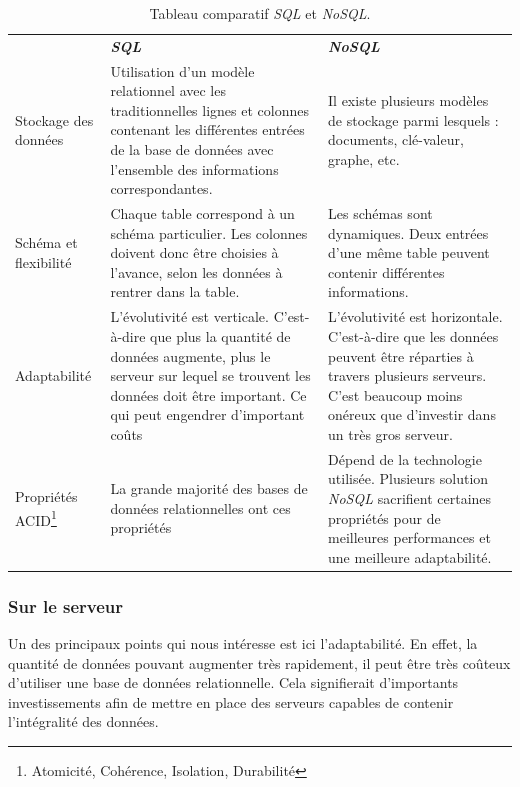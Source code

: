 \documentclass[a4paper,10pt, twoside]{report}
\begin{document}
\begin{spacing}{1.2}
\begin{savenotes}
\begin{table}[h!]
  \def\arraystretch{1.5}
  \setlength{\fboxsep}{13pt} %
  \setlength{\fboxrule}{0pt} %
  \begin{tabular}{lm{6cm}m{6cm}}
   \rowcolor{arkred} 
    \arrayrulecolor{gray73}\hline
    & \color{white} \textbf{\textit{SQL}} &
    \color{white} \textbf{\textit{NoSQL}}\\
    Stockage des données & Utilisation d'un modèle relationnel avec les
    traditionnelles lignes et colonnes contenant les différentes entrées de
    la base de données avec l'ensemble des informations correspondantes. &
    Il existe plusieurs modèles de stockage parmi lesquels : documents,
    clé-valeur, graphe, etc.\\
    \hline
    Schéma et flexibilité & Chaque table correspond à un schéma
    particulier. Les colonnes doivent donc être choisies à l'avance, selon
    les données à rentrer dans la table. & Les schémas sont dynamiques.
    Deux entrées d'une même table peuvent contenir différentes
    informations.\\
    \hline
    Adaptabilité & L'évolutivité est verticale. C'est-à-dire que plus
    la quantité de données augmente, plus le serveur sur lequel se trouvent
    les données doit être important. Ce qui peut engendrer d'important
    coûts & L'évolutivité est horizontale. C'est-à-dire que les
    données peuvent être réparties à travers plusieurs serveurs. C'est beaucoup
    moins onéreux que d'investir dans un très gros serveur.\\
    \hline
    Propriétés ACID\footnote{Atomicité, Cohérence, Isolation,
    Durabilité} & La grande majorité des bases de données relationnelles
    ont ces propriétés & Dépend de la technologie utilisée. Plusieurs
    solution \textit{NoSQL} sacrifient certaines propriétés pour de meilleures
    performances et une meilleure adaptabilité.\\
  \end{tabular}
  \caption{\label{tabSQLNoSQL} Tableau comparatif \textit{SQL} et
  \textit{NoSQL}.}
\end{table}
\end{savenotes}


\subsubsection{Sur le serveur}

Un des principaux points qui nous intéresse est ici l'adaptabilité. En effet,
la quantité de données pouvant augmenter très rapidement, il peut être très
coûteux d'utiliser une base de données relationnelle. Cela signifierait
d'importants investissements afin de mettre en place des serveurs capables de
contenir l'intégralité des données.


\end{spacing}
\end{document}
